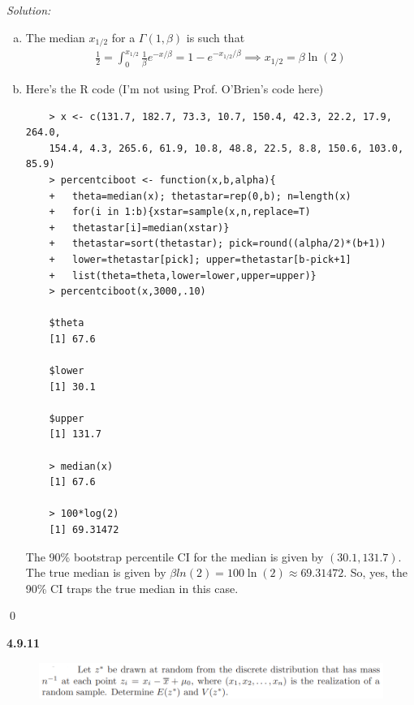 \documentclass{book}
\theoremstyle{definition}
\newcommand{\f}[2]{\frac{#1}{#2}}
\begin{document}
\noindent \textit{Solution:} 


\begin{enumerate}[(a)]
	\item The median $x_{1/2}$ for a $\Gamma(1,\beta)$ is such that
	\begin{align}
	\f{1}{2} = \int^{x_{1/2}}_0 \f{1}{\beta} e^{-x/\beta} = 1 - e^{-x_{1/2}/\beta} \implies \boxed{x_{1/2} = \beta \ln(2)}
	\end{align}
	
	
	\item Here's the R code (I'm not using Prof. O'Brien's code here)
	\begin{lstlisting}
	> x <- c(131.7, 182.7, 73.3, 10.7, 150.4, 42.3, 22.2, 17.9, 264.0,
	154.4, 4.3, 265.6, 61.9, 10.8, 48.8, 22.5, 8.8, 150.6, 103.0, 85.9)
	> percentciboot <- function(x,b,alpha){
	+   theta=median(x); thetastar=rep(0,b); n=length(x)
	+   for(i in 1:b){xstar=sample(x,n,replace=T)
	+   thetastar[i]=median(xstar)}
	+   thetastar=sort(thetastar); pick=round((alpha/2)*(b+1))
	+   lower=thetastar[pick]; upper=thetastar[b-pick+1]
	+   list(theta=theta,lower=lower,upper=upper)}
	> percentciboot(x,3000,.10)
	
	$theta
	[1] 67.6
	
	$lower
	[1] 30.1
	
	$upper
	[1] 131.7
	
	> median(x)
	[1] 67.6
	
	> 100*log(2)
	[1] 69.31472
	\end{lstlisting}
	The 90\% bootstrap percentile CI for the median is given by $(30.1, 131.7)$. The true median is given by $\beta ln(2) = 100 \ln(2)  \approx 69.31472$. So, yes, the 90\% CI traps the true median in this case.
	
	
	
\end{enumerate}\qed






















\newpage
\noindent\textbf{4.9.11}


\begin{figure}[!htb]
	\centering
	\includegraphics[scale=0.5]{4911}
\end{figure}
\end{document}
